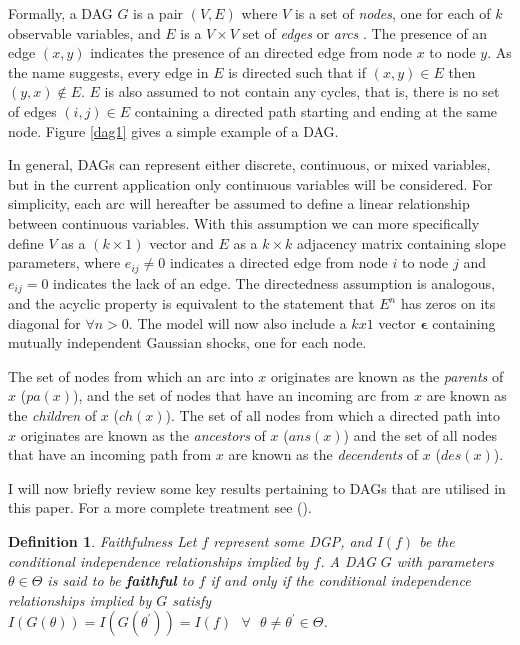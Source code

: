 \documentclass{article}
\newtheorem{definition}{Definition}
\begin{document}
Formally, a DAG $G$ is a pair $(V,E)$ where $V$ is a set of \textit{nodes}, one for each of $k$ observable variables, and $E$ is a $V \times V$ set of \textit{edges} or \textit{arcs} \parencite{kalisch2007estimating}. The presence of an edge $(x,y)$ indicates the presence of an directed edge from node $x$ to node $y$. As the name suggests, every edge in $E$ is directed such that if $(x,y) \in E$ then $(y,x) \not \in E$. $E$ is also assumed to not contain any cycles, that is, there is no set of edges ${(i,j)} \in E$ containing a directed path starting and ending at the same node. Figure \ref{dag1} gives a simple example of a DAG.

In general, DAGs can represent either discrete, continuous, or mixed variables, but in the current application only continuous variables will be considered. For simplicity, each arc will hereafter be assumed to define a linear relationship between continuous variables. With this assumption we can more specifically define $V$ as a $(k \times 1)$ vector and $E$ as a $k \times k$ adjacency matrix containing slope parameters, where $e_{ij} \not = 0$ indicates a directed edge from node $i$ to node $j$ and $e_{ij} = 0$ indicates the lack of an edge. The directedness assumption is analogous, and the acyclic property is equivalent to the statement that $E^n$ has zeros on its diagonal for $\forall n > 0$. The model will now also include a $kx1$ vector $\mathbf{\epsilon}$ containing mutually independent Gaussian shocks, one for each node.

The set of nodes from which an arc into $x$ originates are known as the \textit{parents} of $x$ ($pa(x)$), and the set of nodes that have an incoming arc from $x$ are known as the \textit{children} of $x$ ($ch(x)$). The set of all nodes from which a directed path into $x$ originates are known as the \textit{ancestors} of $x$ ($ans(x)$) and the set of all nodes that have an incoming path from $x$ are known as the \textit{decendents} of $x$ ($des(x)$). 

I will now briefly review some key results pertaining to DAGs that are utilised in this paper. For a more complete treatment see \citeauthor{pearl2009causality} (\citeyear{pearl2009causality}).

\theoremstyle{definition}
\begin{definition}{Faithfulness}
  Let $f$ represent some DGP, and $I(f)$ be the conditional independence relationships implied by $f$. A DAG $G$ with parameters $\theta \in \Theta$ is said to be \textbf{faithful} to $f$ if and only if the conditional independence relationships implied by $G$ satisfy $I(G(\theta)) = I(G(\theta^\prime)) = I(f) \text{  } \forall \text{  } \theta \not = \theta^\prime \in \Theta$.
  \parencite[p.48]{pearl2009causality}
  \label{faithfulness}
\end{definition}
\end{document}
